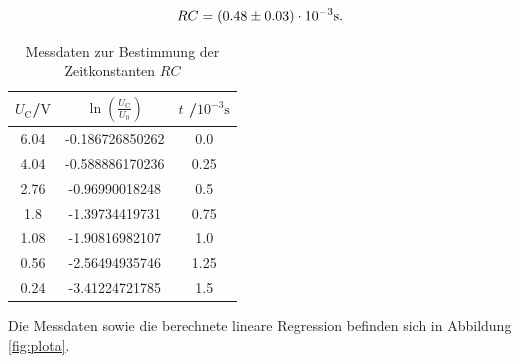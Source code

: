 \begin{equation*}
	\centering
	RC = (0.48 \pm 0.03) \cdot 10^{-3} \si{\second} .
\end{equation*}
\begin{table}
	\caption{Messdaten zur Bestimmung der Zeitkonstanten $RC$}
	\label{tab:taba}
	\centering
	\begin{tabular}{ccc}
		\toprule
		$U_\text{C}$/$\si{\volt}$ & $\ln{(\frac{U_\text{C}}{U_\text{0}})}$ & $t$ /$10^{-3}\si{\second}$ \\
		\midrule
		6.04                      & -0.186726850262                        & 0.0                        \\
		4.04                      & -0.588886170236                        & 0.25                       \\
		2.76                      & -0.96990018248                         & 0.5                        \\
		1.8                       & -1.39734419731                         & 0.75                       \\
		1.08                      & -1.90816982107                         & 1.0                        \\
		0.56                      & -2.56494935746                         & 1.25                       \\
		0.24                      & -3.41224721785                         & 1.5                        \\
		\bottomrule
	\end{tabular}
\end{table}
Die Messdaten sowie die berechnete lineare Regression befinden sich in Abbildung \ref{fig:plota}.
